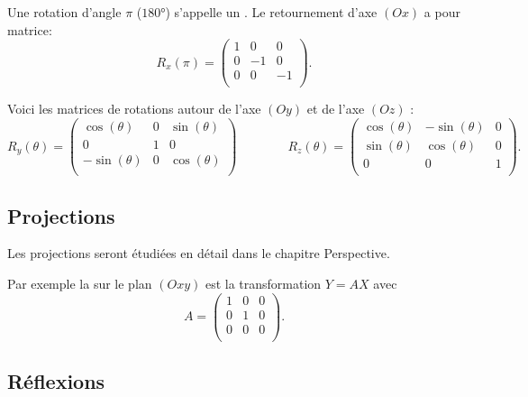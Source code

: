 \documentclass[11pt,class=report,crop=false]{standalone}
\begin{document}

Une rotation d'angle $\pi$ ($\ang{180}$) s'appelle un .
Le retournement d'axe $(Ox)$ a pour matrice:
 $$R_x(\pi) = 
\begin{pmatrix}
1 & 0 & 0 \\
0 & -1 & 0\\
0 & 0 & -1 \\
\end{pmatrix}.$$


Voici les matrices de rotations autour de l'axe $(Oy)$ et de l'axe $(Oz)$ :
$$
R_y(\theta) = 
\begin{pmatrix}
	\cos(\theta) & 0 & \sin(\theta) \\
	0 & 1 & 0 \\	
	-\sin(\theta) & 0 & \cos(\theta) \\
\end{pmatrix}
\qquad \qquad 
R_z(\theta) = 
\begin{pmatrix}
	\cos(\theta) & - \sin(\theta) & 0 \\
	\sin(\theta) & \cos(\theta) & 0\\
	0 & 0 & 1 \\
\end{pmatrix}.$$



\subsection{Projections}


Les projections seront étudiées en détail dans le chapitre \og{}Perspective\fg{}.

Par exemple la  sur le plan $(Oxy)$ est la transformation $Y=AX$ avec
$$A = 
\begin{pmatrix}
	1 & 0 & 0 \\
	0 & 1 & 0 \\
	0 & 0 & 0 \\
\end{pmatrix}.$$



\subsection{Réflexions}
\end{document}
